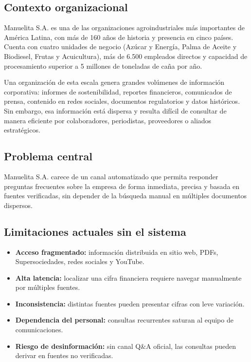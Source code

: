 \documentclass[12pt, a4paper]{article}
\begin{document}
\subsection{Contexto organizacional}

Manuelita S.A. es una de las organizaciones agroindustriales más importantes de América
Latina, con más de 160 años de historia y presencia en cinco países. Cuenta con cuatro
unidades de negocio (Azúcar y Energía, Palma de Aceite y Biodiesel, Frutas y Acuicultura),
más de 6.500 empleados directos y capacidad de procesamiento superior a 5 millones de
toneladas de caña por año.

Una organización de esta escala genera grandes volúmenes de información corporativa:
informes de sostenibilidad, reportes financieros, comunicados de prensa, contenido en
redes sociales, documentos regulatorios y datos históricos. Sin embargo, esa información
está dispersa y resulta difícil de consultar de manera eficiente por colaboradores,
periodistas, proveedores o aliados estratégicos.

\subsection{Problema central}

\begin{tcolorbox}[title=Formulación del problema]
Manuelita S.A. carece de un canal automatizado que permita responder preguntas frecuentes
sobre la empresa de forma inmediata, precisa y basada en fuentes verificadas, sin depender
de la búsqueda manual en múltiples documentos dispersos.
\end{tcolorbox}

\subsection{Limitaciones actuales sin el sistema}

\begin{itemize}
  \item \textbf{Acceso fragmentado:} información distribuida en sitio web, PDFs,
        Supersociedades, redes sociales y YouTube.
  \item \textbf{Alta latencia:} localizar una cifra financiera requiere navegar
        manualmente por múltiples fuentes.
  \item \textbf{Inconsistencia:} distintas fuentes pueden presentar cifras con leve
        variación.
  \item \textbf{Dependencia del personal:} consultas recurrentes saturan al equipo
        de comunicaciones.
  \item \textbf{Riesgo de desinformación:} sin canal Q\&A oficial, las consultas
        pueden derivar en fuentes no verificadas.
\end{itemize}
\end{document}
